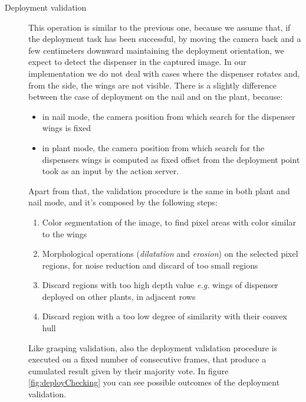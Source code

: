 \begin{description}
\item[Deployment validation] This operation is similar to the previous one, because we assume that, if the deployment task has been successful, by moving the camera back and a few centimeters downward maintaining the deployment orientation, we expect to detect the dispenser in the captured image. In our implementation we do not deal with cases where the dispenser rotates and, from the side, the wings are not visible. There is a slightly difference between the case of deployment on the nail and on the plant, because:
\begin{itemize}
	\item in nail mode, the camera position from which search for the dispenser wings is fixed
	\item in plant mode, the camera position from which search for the dispensers wings is computed as fixed offset from the deployment point took as an input by the action server.
\end{itemize}
Apart from that, the validation procedure is the same in both plant and nail mode, and it's composed by the following steps:
	\begin{enumerate}
		\item Color segmentation of the image, to find pixel areas with color similar to the wings
		\item Morphological operations (\textit{dilatation} and \textit{erosion}) on the selected pixel regions, for noise reduction and discard of too small regions 
		\item Discard regions with too high depth value \textit{e.g.} wings of dispenser deployed on other plants, in adjacent rows
		\item Discard region with a too low degree of similarity with their convex hull
	\end{enumerate}
Like grasping validation, also the deployment validation procedure is executed on a fixed number of consecutive frames, that produce a cumulated result given by their majority vote.
In figure \ref{fig:deployChecking} you can see possible outcomes of the deployment validation.

\end{description}

